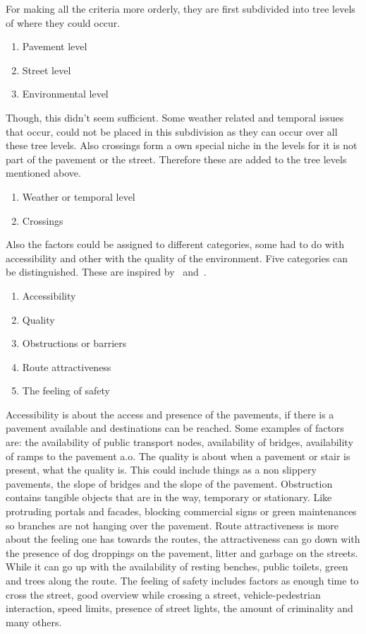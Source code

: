 For making all the criteria more orderly, they are first subdivided into tree levels of where they could occur. 

\begin{enumerate}
\item Pavement level
\item Street level
\item Environmental level
\end{enumerate}
Though, this didn't seem sufficient. Some weather related and temporal issues that occur, could not be placed in this subdivision as they can occur over all these tree levels. Also crossings form a own special niche in the levels for it is not part of the pavement or the street. Therefore these are added to the tree levels mentioned above.
\begin{enumerate}
\item Weather or temporal level
\item Crossings
\end{enumerate}

Also the factors could be assigned to different categories, some had to do with accessibility and other with the quality of the environment. Five categories can be distinguished. These are inspired by~\cite{Ballester2011} and~\cite{Rosenberg2013}.

\begin{enumerate}

\item Accessibility
\item Quality 
\item Obstructions or barriers
\item Route attractiveness 
\item The feeling of safety
\end{enumerate}

Accessibility is about the access and presence of the pavements, if there is a pavement available and destinations can be reached. Some examples of factors are: the availability of public transport nodes, availability of bridges, availability of ramps to the pavement a.o. 
The quality is about when a pavement or stair is present, what the quality is. This could include things as a non slippery pavements, the slope of bridges and the slope of the pavement. 
Obstruction contains tangible objects that are in the way, temporary or stationary. Like protruding portals and facades, blocking commercial signs or green maintenances so branches are not hanging over the pavement.
Route attractiveness is more about the feeling one has towards the routes, the attractiveness can go down with the presence of dog droppings on the pavement, litter and garbage on the streets. While it can go up with the availability of resting benches, public toilets, green and trees along the route. 
The feeling of safety includes factors as enough time to cross the street, good overview while crossing a street, vehicle-pedestrian interaction, speed limits, presence of street lights, the amount of criminality and many others. 


